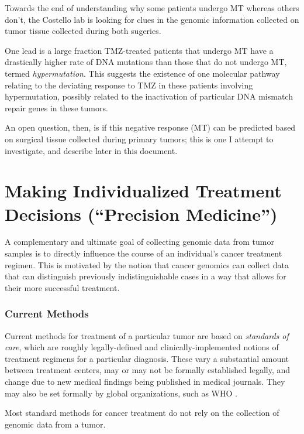        Towards the end of understanding why some patients undergo MT
       whereas others don't, the Costello lab is looking for clues in
       the genomic information collected on tumor tissue collected
       during both sugeries.

       One lead is a large fraction TMZ-treated patients that undergo MT 
       have a drastically higher rate of DNA mutations than those that
       do not undergo MT, termed \textit{hypermutation}. This suggests
       the existence of one molecular pathway relating to the
       deviating response to TMZ in these patients involving
       hypermutation, possibly related to the inactivation of
       particular DNA mismatch repair genes in these tumors.

       An open question, then, is if this negative response (MT) can
       be predicted based on surgical tissue collected during primary
       tumors; this is one I attempt to investigate, and describe
       later in this document.

       \section{Making Individualized Treatment Decisions (``Precision
         Medicine'')}

       A complementary and ultimate goal of collecting genomic data
       from tumor samples is to directly influence the course of an
       individual's cancer treatment regimen. This is motivated by the
       notion that cancer genomics can collect data that can
       distinguish previously indistinguishable cases in a way that
       allows for their more successful treatment.

       \subsubsection{Current Methods}
       Current methods for treatment of a particular tumor are based
       on \textit{standards of care}, which are roughly
       legally-defined and clinically-implemented notions of treatment
      regimens for a particular diagnosis. These vary a substantial
      amount between treatment centers, may or may not be formally
      established legally, and change due to new medical findings
      being published in medical journals. They may also be set
      formally by global organizations, such as WHO
      \cite{moffett_standard_2011}.

      Most standard methods for cancer treatment do not rely on the
      collection of genomic data from a tumor.

